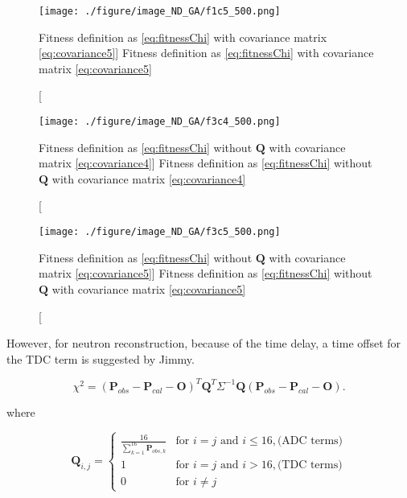 \begin{figure}
    \centering
    \texttt{[image: ./figure/image\_ND\_GA/f1c5\_500.png]}
    \caption
    [Fitness definition as \ref{eq:fitnessChi} with covariance matrix \ref{eq:covariance5}]
    {Fitness definition as \ref{eq:fitnessChi} with covariance matrix \ref{eq:covariance5}}
    \label{fig:f1c5_500.png}
    \end{figure}


\begin{figure}
    \centering
    \texttt{[image: ./figure/image\_ND\_GA/f3c4\_500.png]}
    \caption
    [Fitness definition as \ref{eq:fitnessChi} without $\mathbf{Q}$ with covariance matrix \ref{eq:covariance4}]
    {Fitness definition as \ref{eq:fitnessChi} without $\mathbf{Q}$ with covariance matrix \ref{eq:covariance4}}
    \label{fig:f3c4_500.png}
    \end{figure}

\begin{figure}
    \centering
    \texttt{[image: ./figure/image\_ND\_GA/f3c5\_500.png]}
    \caption
    [Fitness definition as \ref{eq:fitnessChi} without $\mathbf{Q}$ with covariance matrix \ref{eq:covariance5}]
    {Fitness definition as \ref{eq:fitnessChi} without $\mathbf{Q}$ with covariance matrix \ref{eq:covariance5}}
    \label{fig:f3c5_500.png}
    \end{figure}








However, for neutron reconstruction, because of the time delay, a time offset
for the TDC term is suggested by Jimmy.



\begin{equation}
\label{eq:fitnessChiTimeOffset}
\chi^{2} = (\mathbf{P}_{obs} - \mathbf{P}_{cal} - \mathbf{O})^T\mathbf{Q}^T\Sigma^{-1}\mathbf{Q}(\mathbf{P}_{obs} - \mathbf{P}_{cal} - \mathbf{O}).
\end{equation}

where

\begin{equation}
\label{eq:fitnessQTimeOffset}
\mathbf{Q}_{i,j}
= \left\{
    \begin{array}{lll}
        \frac{16} {  {\sum^{16}_{k=1}}  {\mathbf{P}_{obs,k}}  } & \mbox{for } i=j \mbox{ and } i\leq16, \mbox{(ADC terms)} \\
        1 & \mbox{for } i=j \mbox{ and } i>16, \mbox{(TDC terms)} \\
        0 & \mbox{for } i{\neq}j
    \end{array} \right.
\end{equation}




